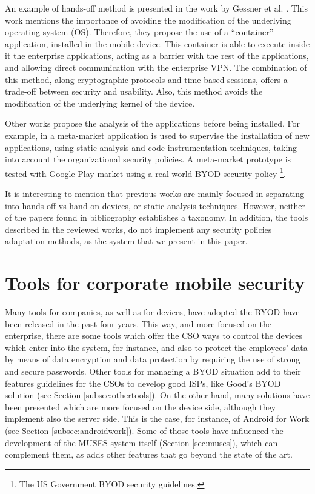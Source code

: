 An example of hands-off method is presented in the work by Gessner et al. \cite{Gessner13userfriendly}. This work mentions the importance of avoiding the modification of the underlying operating system (OS). Therefore, they propose the use of a ``container'' application, installed in the mobile device. This container is able to execute inside it the enterprise applications, acting as a barrier with the rest of the applications, and allowing direct communication with the enterprise VPN. The combination of this method, along cryptographic protocols and time-based sessions, offers a trade-off between security and usability. Also, this method avoids the modification of the underlying kernel of the device.

Other works propose the analysis of the applications before being installed. For example, in \cite{Armando14metamarket} a meta-market application is used to supervise the installation of new applications, using static analysis and code instrumentation techniques, taking into account the organizational security policies. A meta-market prototype is tested with Google Play market using a real world BYOD security policy \footnote{The US Government BYOD security guidelines.}.


It is interesting to mention that previous works are mainly focused in separating into hands-off vs hand-on devices, or static analysis techniques. However, neither of the papers found in bibliography establishes a taxonomy. In addition, the tools described in the reviewed works, do not implement any security policies adaptation methods, as the system that we present in this paper.

\section{Tools for corporate mobile security}
\label{sec:toolsreview}

Many tools for companies, as well as for devices, have adopted the BYOD have been released in the past four years. This way, and
more focused on the enterprise, there are some tools which offer the CSO ways to control the devices which enter into the system, for instance, and also to protect the employees' data by means of data encryption and data protection by requiring the use of strong and secure passwords. Other tools for managing a BYOD situation add to their features guidelines for the CSOs to develop good ISPs, like Good's BYOD solution (see Section \ref{subsec:othertools}). On the other hand, many solutions have been presented which are more focused on the device side, although they implement also the server side. This is the case, for instance, of Android for Work (see Section \ref{subsec:androidwork}). Some of those tools have influenced the development of the MUSES system  itself (Section \ref{sec:muses}), which can complement them, as adds other features that go beyond the state of the art. 


